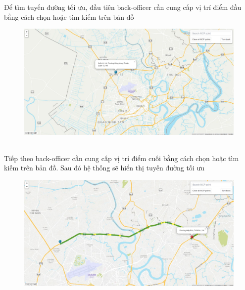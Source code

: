 \documentclass[a4paper]{article}
\begin{document}
\begin{enumerate}
Để tìm tuyến đường tối ưu, đầu tiên back-officer cần cung cấp vị trí điểm đầu bằng cách chọn hoặc tìm kiếm trên bản đồ
                   \begin{figure}[!h]
    \begin{center}
      \includegraphics[width=5in]{Image/route_1.jpg}
    \end{center}
\end{figure} 
\\
\newpage
 Tiếp theo back-officer cần cung cấp vị trí điểm cuối bằng cách chọn hoặc tìm kiếm trên bản đồ. Sau đó hệ thống sẽ hiển thị tuyến đường tối ưu 
                      \begin{figure}[!h]
    \begin{center}
      \includegraphics[width=5in]{Image/route_2.jpg}
    \end{center}
\end{figure} 
\\
\newpage


\end{enumerate}
\end{document}
